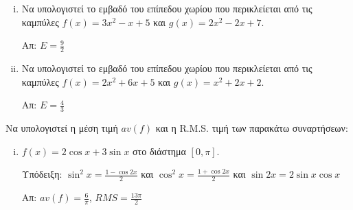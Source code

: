 \documentclass[a4paper]{report}
\begin{document}
\begin{center}
  \minibox{\large\bfseries \textcolor{Col1}{Aσκήσεις στις Εφαρμογές του
  Ολοκληρώματος}}
\end{center}

\vspace{\baselineskip}

\begin{exercise}
  \begin{enumerate}[i)]
    \item Να υπολογιστεί το εμβαδό του επίπεδου χωρίου που περικλείεται 
      από τις καμπύλες $ f(x) = 3x^2-x+5 $ και $ g(x) = 2x^2-2x+7 $.

  \hfill Απ: $ E = \frac{9}{2} $ 

    \item Να υπολογιστεί το εμβαδό του επίπεδου χωρίου που περικλείεται 
      από τις καμπύλες $ f(x) = 2x^2+6x+5 $ και $ g(x) = x^2+2x+2 $.

  \hfill Απ: $ E = \frac{4}{3} $ 
  \end{enumerate}
\end{exercise}

\begin{exercise}
  Να υπολογιστεί η μέση τιμή $ av(f) $ και η R.M.S. τιμή των παρακάτω 
  συναρτήσεων:

  \begin{enumerate}[i)]
    \item $ f(x) = 2 \cos{x} + 3 \sin{x} $ στο διάστημα $ [0, \pi] $.

      \quad \textcolor{Col1}{Υπόδειξη:} 
      $ \sin^{2}{x} = \frac{1- \cos{2x}}{2}$ και $ \cos^{2}{x}
      = \frac{1+ \cos{2x}}{2} $ και $ \sin{2x} = 2 \sin{x} \cos{x} $ 

      \hfill Απ: $ av(f) = \frac{6}{\pi} $, $ RMS= \frac{13 \pi}{2} $ 
  \end{enumerate}
\end{exercise}
\end{document}
